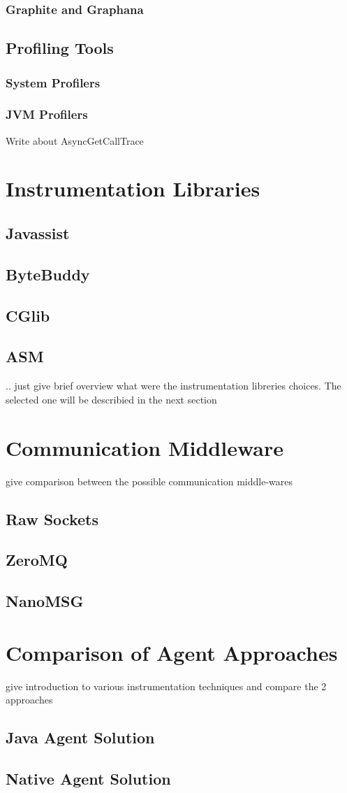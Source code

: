 \subsubsection{Graphite and Graphana}
\subsection{Profiling Tools}
\subsubsection{System Profilers}
\subsubsection{JVM Profilers}
Write about AsyncGetCallTrace



\section{Instrumentation Libraries}
\subsection{Javassist}
\subsection{ByteBuddy}
\subsection{CGlib}
\subsection{ASM}
.. just give brief overview what were the instrumentation libreries choices. The selected one will be describied in the next section

\section{Communication Middleware}
give comparison between the possible communication middle-wares
\subsection{Raw Sockets}
\subsection{ZeroMQ}
\subsection{NanoMSG}

\section{Comparison of Agent Approaches}
give introduction to various instrumentation techniques and compare the 2 approaches
\subsection{Java Agent Solution}
\subsection{Native Agent Solution}

